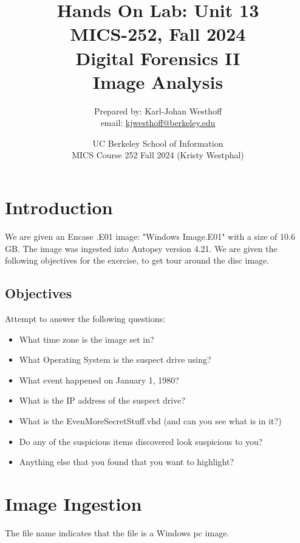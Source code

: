 \documentclass[
	letterpaper, %
	10pt, %
	unnumberedsections, %
	twoside, %
]{APAAssignment}
\title{Hands On Lab: Unit 13 \\ MICS-252, Fall 2024 \\ Digital Forensics II \\ Image Analysis}
\date{UC Berkeley School of Information \\
MICS Course 252 Fall 2024 (Kristy Westphal)
}
\author{
	Prepared by: Karl-Johan Westhoff \\
	email: \href{mailto:kjwesthoff@berkeley.edu}{kjwesthoff@berkeley.edu}
}
\begin{document}
\onecolumn
\maketitle %


\section{Introduction}
We are given an Encase .E01 image: "Windows Image.E01" with a size of 10.6 GB. The image was ingested into Autopsy version 4.21. We are given the following objectives for the exercise, to get tour around the disc image.

\subsection{Objectives}

Attempt to answer the following questions:
\begin{itemize}
	\item What time zone is the image set in?
	\item What Operating System is the suspect drive using?
	\item What event happened on January 1, 1980?
	\item What is the IP address of the suspect drive?
	\item What is the EvenMoreSecretStuff.vhd (and can you see what is in it?)
	\item Do any of the suspicious items discovered look suspicious to you?
	\item Anything else that you found that you want to highlight?
\end{itemize}


\section{Image Ingestion}
The file name indicates that the file is a Windows pc image.



%
%
\end{document}
